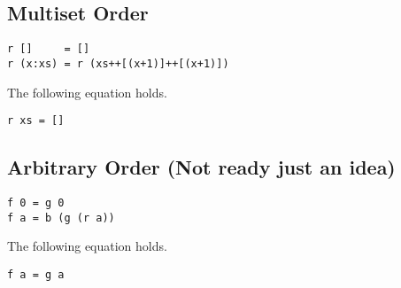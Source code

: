 \subsection{Multiset Order}
\begin{verbatim}
r []     = []
r (x:xs) = r (xs++[(x+1)]++[(x+1)])
\end{verbatim}
\begin{claim}The following equation holds.
\begin{verbatim}
r xs = []
\end{verbatim}
\end{claim}
\subsection{Arbitrary Order (Not ready just an idea)}
\begin{verbatim}
f 0 = g 0
f a = b (g (r a))
\end{verbatim}
\begin{claim}The following equation holds.
\begin{verbatim}
f a = g a
\end{verbatim}
\end{claim}